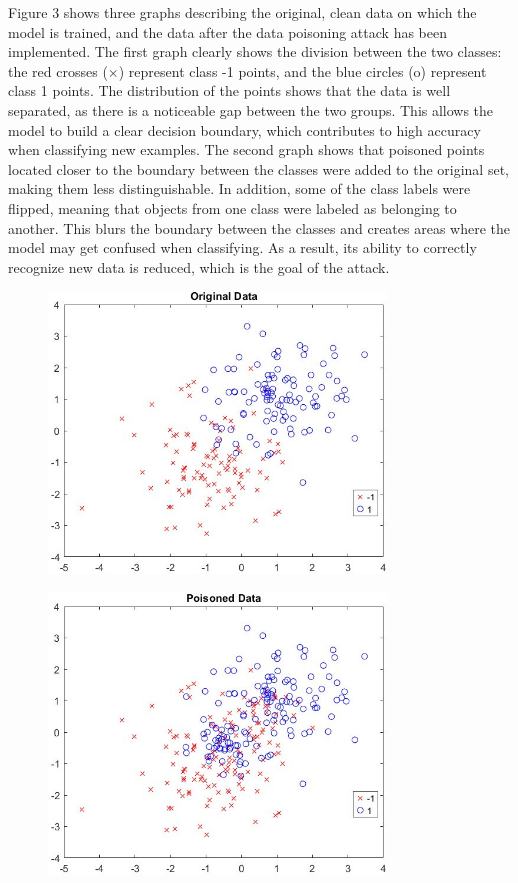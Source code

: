 \begin{multicols}{2}
Figure 3 shows three graphs describing the original, clean data on which
the model is trained, and the data after the data poisoning attack has
been implemented. The first graph clearly shows the division between the
two classes: the red crosses (×) represent class -1 points, and the blue
circles (o) represent class 1 points. The distribution of the points
shows that the data is well separated, as there is a noticeable gap
between the two groups. This allows the model to build a clear decision
boundary, which contributes to high accuracy when classifying new
examples. The second graph shows that poisoned points located closer to
the boundary between the classes were added to the original set, making
them less distinguishable. In addition, some of the class labels were
flipped, meaning that objects from one class were labeled as belonging
to another. This blurs the boundary between the classes and creates
areas where the model may get confused when classifying. As a result,
its ability to correctly recognize new data is reduced, which is the
goal of the attack.
\end{multicols}

\begin{figure}[H]
	\centering
	\includegraphics[width=0.8\textwidth]{media/ict2/image226}
	\caption*{}
\end{figure}

\begin{figure}[H]
	\centering
	\includegraphics[width=0.8\textwidth]{media/ict2/image227}
	\caption*{}
\end{figure}

